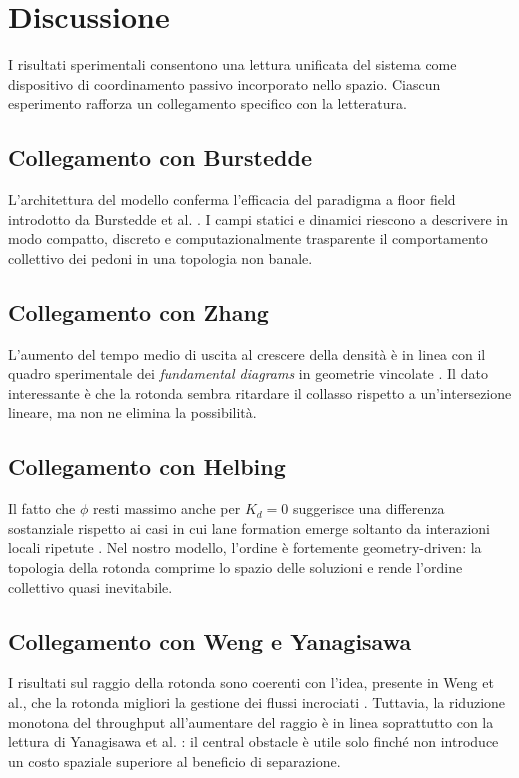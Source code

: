 \section{Discussione}
I risultati sperimentali consentono una lettura unificata del sistema come dispositivo di coordinamento passivo incorporato nello spazio. Ciascun esperimento rafforza un collegamento specifico con la letteratura.

\subsection{Collegamento con Burstedde}
L'architettura del modello conferma l'efficacia del paradigma a floor field introdotto da Burstedde et al. \cite{burstedde2001}. I campi statici e dinamici riescono a descrivere in modo compatto, discreto e computazionalmente trasparente il comportamento collettivo dei pedoni in una topologia non banale.

\subsection{Collegamento con Zhang}
L'aumento del tempo medio di uscita al crescere della densità è in linea con il quadro sperimentale dei \textit{fundamental diagrams} in geometrie vincolate \cite{zhang2012}. Il dato interessante è che la rotonda sembra ritardare il collasso rispetto a un'intersezione lineare, ma non ne elimina la possibilità.

\subsection{Collegamento con Helbing}
Il fatto che $\phi$ resti massimo anche per $K_d = 0$ suggerisce una differenza sostanziale rispetto ai casi in cui lane formation emerge soltanto da interazioni locali ripetute \cite{helbing2005}. Nel nostro modello, l'ordine è fortemente geometry-driven: la topologia della rotonda comprime lo spazio delle soluzioni e rende l'ordine collettivo quasi inevitabile.

\subsection{Collegamento con Weng e Yanagisawa}
I risultati sul raggio della rotonda sono coerenti con l'idea, presente in Weng et al., che la rotonda migliori la gestione dei flussi incrociati \cite{weng2006}. Tuttavia, la riduzione monotona del throughput all'aumentare del raggio è in linea soprattutto con la lettura di Yanagisawa et al. \cite{yanagisawa2019}: il central obstacle è utile solo finché non introduce un costo spaziale superiore al beneficio di separazione.

